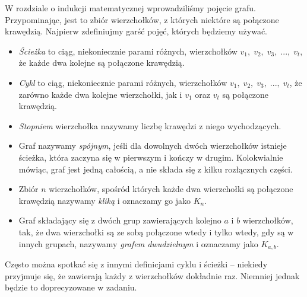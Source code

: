 


\noindent
W rozdziale o indukcji matematycznej wprowadziliśmy pojęcie grafu. Przypominając, jest to zbiór wierzchołków, z których niektóre są połączone krawędzią. Najpierw zdefiniujmy garść pojęć, których będziemy używać.

\vspace{5px}


\noindent
\begin{itemize}
    \item \textit{Ścieżka} to ciąg, niekoniecznie parami różnych, wierzchołków $v_1, \; v_2, \; v_3, \; ..., \; v_t$, że każde dwa kolejne są połączone krawędzią.
    \item \textit{Cykl} to ciąg, niekoniecznie parami różnych, wierzchołków $v_1, \; v_2, \; v_3, \; ..., \; v_t$, że zarówno każde dwa kolejne wierzchołki, jak i $v_1$ oraz $v_t$ są połączone krawędzią. 
    \item \textit{Stopniem} wierzchołka nazywamy liczbę krawędzi z niego wychodzących.
    \item Graf nazywamy \textit{spójnym}, jeśli dla dowolnych dwóch wierzchołków istnieje ścieżka, która zaczyna się w pierwszym i kończy w drugim. Kolokwialnie mówiąc, graf jest jedną całością, a nie składa się z kilku rozłącznych części.
    \item Zbiór $n$ wierzchołków, spośród których każde dwa wierzchołki są połączone krawędzią nazywamy \textit{kliką} i oznaczamy go jako $K_n$.
    \item Graf składający się z dwóch grup zawierających kolejno $a$ i $b$ wierzchołków, tak, że dwa wierzchołki są ze sobą połączone wtedy i tylko wtedy, gdy są w innych grupach, nazywamy \textit{grafem dwudzielnym} i oznaczamy jako $K_{a, b}$.
\end{itemize}

\begin{remark}
    Często można spotkać się z innymi definicjami cyklu i ścieżki -- niekiedy przyjmuje się, że zawierają każdy z wierzchołków dokładnie raz. Niemniej jednak będzie to doprecyzowane w zadaniu.
\end{remark}

